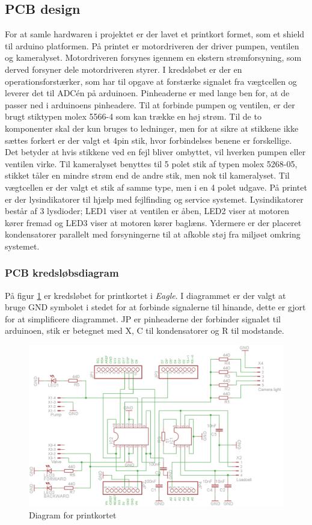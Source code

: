  
\subsection{PCB design} 
For at samle hardwaren i projektet er der lavet et printkort formet, som et shield til arduino platformen. På printet er motordriveren der driver pumpen, ventilen og kameralyset. Motordriveren forsynes igennem en ekstern strømforsyning, som derved forsyner dele motordriveren styrer. I kredsløbet er der en operationsforstærker, som har til opgave at forstærke signalet fra vægtcellen og leverer det til ADCén på arduinoen. Pinheaderne er med lange ben for, at de passer ned i arduinoens pinheadere. Til at forbinde pumpen og ventilen, er der brugt stiktypen molex 5566-4 som kan trække en høj strøm. Til de to komponenter skal der kun bruges to ledninger, men for at sikre at stikkene ikke sættes forkert er der valgt et 4pin stik, hvor forbindelses benene er forskellige. Det betyder at hvis stikkene ved en fejl bliver ombyttet, vil hverken pumpen eller ventilen virke. Til kameralyset benyttes til 5 polet stik af typen molex 5268-05, stikket tåler en mindre strøm end de andre stik, men nok til kameralyset. Til vægtcellen er der valgt et stik af samme type, men i en 4 polet udgave. På printet er der lysindikatorer til hjælp med fejlfinding og service systemet. Lysindikatorer består af 3 lysdioder; LED1 viser at ventilen er åben, LED2 viser at motoren kører fremad og LED3 viser at motoren kører baglæns. Ydermere er der placeret kondensatorer parallelt med forsyningerne til at afkoble støj fra miljøet omkring systemet.

\newpage
\subsubsection{PCB kredsløbsdiagram}
På figur \ref{fig:PCBdiagram} er kredsløbet for printkortet i \textit{Eagle}. I diagrammet er der valgt at bruge GND symbolet i stedet for at forbinde signalerne til hinande, dette er gjort for at simplificere diagrammet. JP er pinheaderne der forbinder signalet til arduinoen, stik er betegnet med X, C til kondensatorer og R til modstande.

\begin{figure}[H]

	\centering
	\includegraphics[width=1\textwidth]{billeder/hardware/Diagram.png}
	\caption{Diagram for printkortet}
	\label{fig:PCBdiagram}
\end{figure}

